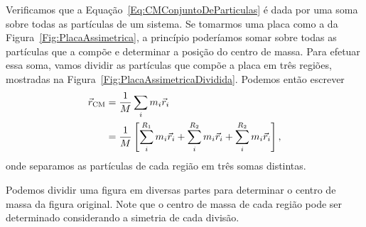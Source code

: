 Verificamos que a Equação~\ref{Eq:CMConjuntoDeParticulas} é dada por uma soma sobre todas as partículas de um sistema. Se tomarmos uma placa como a da Figura~\ref{Fig:PlacaAssimetrica}, a princípio poderíamos somar sobre todas as partículas que a compõe e determinar a posição do centro de massa. Para efetuar essa soma, vamos dividir as partículas que compõe a placa em três regiões, mostradas na Figura~\ref{Fig:PlacaAssimetricaDividida}. Podemos então escrever
\begin{align}
    \vec{r}_{\rm{CM}} &= \frac{1}{M} \sum_{i} m_i \vec{r}_i \\
    &= \frac{1}{M} \left[ \sum_{i}^{R_1} m_i \vec{r}_i + \sum_{i}^{R_2} m_i \vec{r}_i +\sum_{i}^{R_2} m_i \vec{r}_i\right], \label{Eq:Discretizando}
\end{align}
%
onde separamos as partículas de cada região em três somas distintas.

\begin{marginfigure}
\centering
{}
\caption{Podemos dividir uma figura em diversas partes para determinar o centro de massa da figura original. Note que o centro de massa de cada região pode ser determinado considerando a simetria de cada divisão.\label{Fig:PlacaAssimetricaDividida}}
\end{marginfigure}

